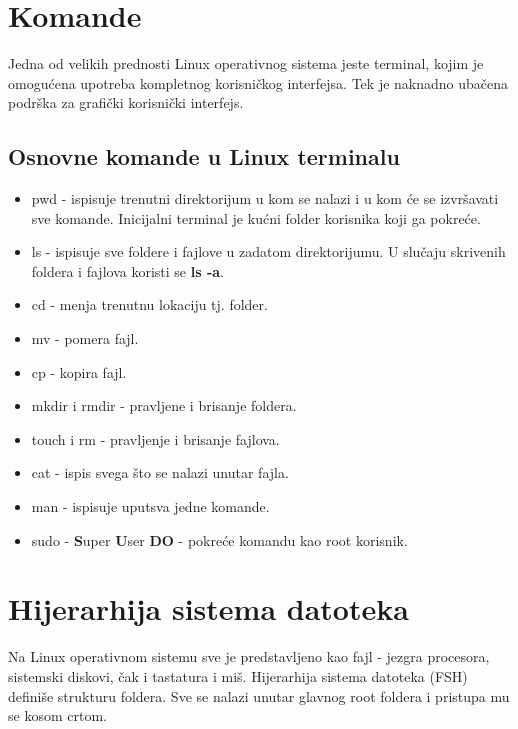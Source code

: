 \documentclass[a4paper,14pt]{article}
\begin{document}
\section{Komande}
Jedna od velikih prednosti Linux operativnog sistema jeste terminal, kojim je omogućena upotreba kompletnog korisničkog interfejsa. Tek je naknadno ubačena podrška za grafički korisnički interfejs.
\subsection{Osnovne komande u Linux terminalu}
\begin{itemize}
\item pwd - ispisuje trenutni direktorijum u kom se nalazi i u kom će se izvršavati sve komande. Inicijalni terminal je kućni folder korisnika koji ga pokreće.
\item ls - ispisuje sve foldere i fajlove u zadatom direktorijumu. U slučaju skrivenih foldera i fajlova koristi se \textbf{ls -a}.
\item cd - menja trenutnu lokaciju tj. folder.
\item mv - pomera fajl.
\item cp - kopira fajl.
\item mkdir i rmdir - pravljene i brisanje foldera.
\item touch i rm - pravljenje i brisanje fajlova.
\item cat - ispis svega što se nalazi unutar fajla.
\item man - ispisuje uputsva jedne komande.
\item sudo - \textbf{S}uper \textbf{U}ser \textbf{DO} - pokreće komandu kao root korisnik.
\end{itemize}
\newpage

\section{Hijerarhija sistema datoteka}
Na Linux operativnom sistemu sve je predstavljeno kao fajl - jezgra procesora, sistemski diskovi, čak i tastatura i miš. Hijerarhija sistema datoteka (FSH) definiše strukturu foldera. Sve se nalazi unutar glavnog root foldera i pristupa mu se kosom crtom.
\end{document}

